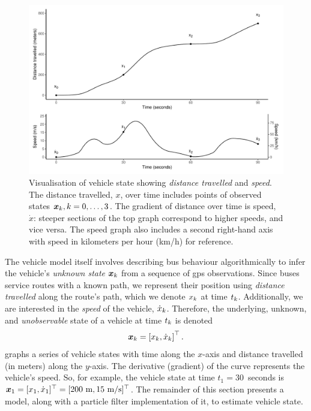 \begin{knitrout}\small
{}\color{fgcolor}\begin{figure}

{\centering \includegraphics[width=\textwidth]{figure/vehicle_state-1} 

}

\caption[Visualisation of vehicle state showing \emph{distance travelled} and \emph{speed}]{Visualisation of vehicle state showing \emph{distance travelled} and \emph{speed}. The distance travelled, $x$, over time includes points of observed states $\boldsymbol x_k, k=0,\ldots,3$. The gradient of distance over time is speed, $\dot x$: steeper sections of the top graph correspond to higher speeds, and vice versa. The speed graph also includes a second right-hand axis with speed in kilometers per hour (km/h) for reference.}\label{fig:vehicle_state}
\end{figure}


\end{knitrout}

The vehicle model itself involves describing bus behaviour algorithmically to infer the vehicle's \emph{unknown state} $\boldsymbol x_k$ from a sequence of \gls{gps} observations. Since buses service routes with a known path, we represent their position using \emph{distance travelled} along the route's path, which we denote $x_k$ at time $t_k$. Additionally, we are interested in the \emph{speed} of the vehicle, $\dot x_k$. Therefore, the underlying, unknown, and \emph{unobservable} state of a vehicle at time $t_k$ is denoted
\begin{equation}
\label{eq:vehicle_state}
\boldsymbol x_k = \left[x_k, \dot x_k\right]^\top.
\end{equation}
 graphs a series of vehicle states with time along the $x$-axis and distance travelled (in meters) along the $y$-axis. The derivative (gradient) of the curve represents the vehicle's speed. So, for example, the vehicle state at time $t_1 = 30$~seconds is $\boldsymbol x_1 = [x_1, \dot x_1]^\top = [200~\text{m}, 15~\text{m/s}]^\top$. The remainder of this section presents a model, along with a particle filter implementation of it, to estimate vehicle state.

